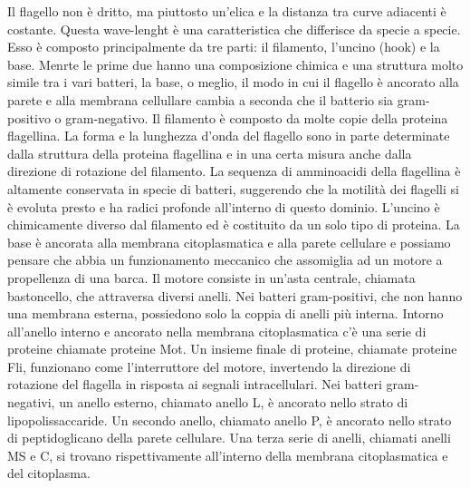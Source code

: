 Il flagello non è dritto, ma piuttosto un’elica e la distanza tra curve adiacenti è 
costante. Questa wave-lenght è una caratteristica che differisce da specie a specie. Esso è composto principalmente da tre parti: il filamento, l’uncino 
(hook) e la base. Menrte le prime due hanno una composizione chimica e una struttura molto simile tra i vari batteri, la base, o meglio, il modo in cui il 
flagello è ancorato alla parete e alla membrana cellullare cambia a seconda che il batterio sia gram-positivo o gram-negativo. Il filamento è composto da 
molte copie della proteina flagellina. La forma e la lunghezza d'onda del flagello sono in parte determinate dalla struttura della proteina flagellina e in 
una certa misura anche dalla direzione di rotazione del filamento. La sequenza di amminoacidi della flagellina è altamente conservata in specie di batteri, 
suggerendo che la motilità dei flagelli si è evoluta presto e ha radici profonde all'interno di questo dominio. L’uncino è chimicamente diverso dal 
filamento ed è costituito da un solo tipo di proteina. La base è ancorata alla membrana citoplasmatica e alla parete cellulare e possiamo pensare che abbia 
un funzionamento meccanico che assomiglia ad un motore a propellenza di una barca. Il motore consiste in un’asta centrale, chiamata bastoncello, che 
attraversa diversi anelli. Nei batteri gram-positivi, che non hanno una membrana esterna, possiedono solo la coppia di anelli più interna.
 Intorno 
all'anello interno e ancorato nella membrana citoplasmatica c'è una serie di proteine chiamate proteine Mot. Un insieme finale di proteine, chiamate 
proteine Fli, funzionano come l'interruttore del motore, invertendo la direzione di rotazione del flagella in risposta ai segnali intracellulari. Nei 
batteri gram-negativi, un anello esterno, chiamato anello L, è ancorato nello strato di lipopolissaccaride. Un secondo anello, chiamato anello P, è ancorato 
nello strato di peptidoglicano della parete cellulare. Una terza serie di anelli, chiamati anelli MS e C, si trovano rispettivamente all'interno della 
membrana citoplasmatica e del citoplasma.
